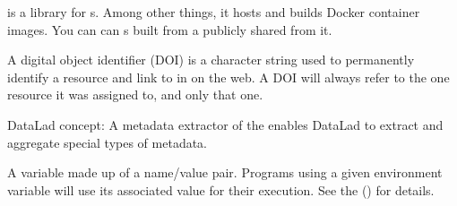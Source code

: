 \begin{description}
\ignorespaces 
\sphinxAtStartPar
{} is a library for {\hyperref[\detokenize{glossary:term-Docker}]{}} {\hyperref[\detokenize{glossary:term-container-image}]{}}s.
Among other things, it hosts and builds Docker container images.
You can can  {\hyperref[\detokenize{glossary:term-container-image}]{}}s built from a publicly shared {\hyperref[\detokenize{glossary:term-container-recipe}]{}} from it.

\sphinxAtStartPar
A digital object identifier (DOI) is a character string used to permanently identify
a resource and link to in on the web. A DOI will always refer to the one resource
it was assigned to, and only that one.

\ignorespaces 
\sphinxAtStartPar
DataLad concept: A metadata extractor of the {\hyperref[\detokenize{glossary:term-DataLad-extension}]{}} 
enables DataLad to extract and aggregate special types of metadata.

\ignorespaces 
\sphinxAtStartPar
A variable made up of a name/value pair. Programs using a given environment variable will use its associated value for their execution.
See the {\hyperref[\detokenize{basics/101-123-config2:fom-envvar}]{}} () for details.


\end{description}
